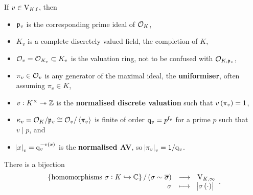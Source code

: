 \begin{notation*}
If $ v \in \mathrm{V}_{K, \mathrm{f}} $, then
\begin{itemize}
\item $ \mathfrak{p}_v $ is the corresponding prime ideal of $ \mathcal{O}_K $,
\item $ K_v $ is a complete discretely valued field, the completion of $ K $,
\item $ \mathcal{O}_v = \mathcal{O}_{K_v} \subset K_v $ is the valuation ring, not to be confused with $ \mathcal{O}_{K, \mathfrak{p}_v} $,
\item $ \pi_v \in \mathcal{O}_v $ is any generator of the maximal ideal, the \textbf{uniformiser}, often assuming $ \pi_v \in K $,
\item $ v : K^\times \twoheadrightarrow \mathbb{Z} $ is the \textbf{normalised discrete valuation} such that $ v\br{\pi_v} = 1 $,
\item $ \kappa_v = \mathcal{O}_K / \mathfrak{p}_v \cong \mathcal{O}_v / \left\langle \pi_v \right\rangle $ is finite of order $ \mathrm{q}_v = p^{\mathrm{f}_v} $ for a prime $ p $ such that $ v \mid p $, and
\item $ \abs{x}_v = \q_v^{-v\br{x}} $ is the \textbf{normalised AV}, so $ \abs{\pi_v}_v = 1 / \mathrm{q}_v $.
\end{itemize}
\end{notation*}

\begin{theorem}
There is a bijection
$$ \function{\cbr{\text{homomorphisms} \ \sigma : K \hookrightarrow \CC} / \br{\sigma \sim \overline{\sigma}}}{\V_{K, \infty}}{\sigma}{\abs{\sigma\br{\cdot}}}. $$
\end{theorem}

